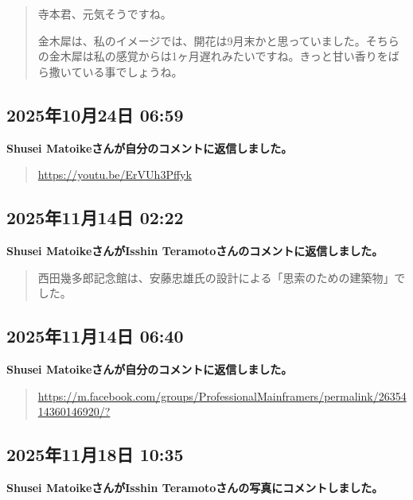 \begin{quote}
寺本君、元気そうですね。

金木犀は、私のイメージでは、開花は9月末かと思っていました。そちらの金木犀は私の感覚からは1ヶ月遅れみたいですね。きっと甘い香りをばら撒いている事でしょうね。
\end{quote}

\subsection*{2025年10月24日 06:59}

\textbf{Shusei Matoikeさんが自分のコメントに返信しました。}

\begin{quote}
\url{https://youtu.be/ErVUh3Pffyk}
\end{quote}

\subsection*{2025年11月14日 02:22}

\textbf{Shusei MatoikeさんがIsshin Teramotoさんのコメントに返信しました。}

\begin{quote}
西田幾多郎記念館は、安藤忠雄氏の設計による「思索のための建築物」でした。
\end{quote}

\subsection*{2025年11月14日 06:40}

\textbf{Shusei Matoikeさんが自分のコメントに返信しました。}

\begin{quote}
\url{https://m.facebook.com/groups/ProfessionalMainframers/permalink/2635414360146920/?}
\end{quote}

\subsection*{2025年11月18日 10:35}

\textbf{Shusei MatoikeさんがIsshin Teramotoさんの写真にコメントしました。}

